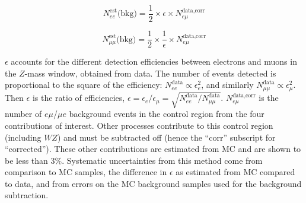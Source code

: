 \begin{equation}
N_{ee}^\text{est}\text{(bkg)} = \frac{1}{2} \times \epsilon \times N_{e\mu}^\text{data,corr}
\end{equation}

\begin{equation}
N_{\mu\mu}^\text{est}\text{(bkg)} = \frac{1}{2} \times \frac{1}{\epsilon} \times N_{e\mu}^\text{data,corr}
\end{equation}

\noindent $\epsilon$ accounts for the different detection efficiencies between electrons and muons in the $Z$-mass window, obtained from data. The number of events detected is proportional to the square of the efficiency: $N_{ee}^\text{data} \propto \epsilon_e^2$, and similarly $N_{\mu\mu}^\text{data} \propto \epsilon_\mu^2$. Then $\epsilon$ is the ratio of efficiencies, $\epsilon = \epsilon_e/\epsilon_\mu = \sqrt{N_{ee}^\text{data}/N_{\mu\mu}^\text{data}}$. $N_{e\mu}^\text{data,corr}$ is the number of $e\mu$/$\mu e$ background events in the control region from the four contributions of interest. Other processes contribute to this control region (including $WZ$) and must be subtracted off (hence the ``corr'' subscript for ``corrected''). These other contributions are estimated from MC and are shown to be less than $3\%$. Systematic uncertainties from this method come from comparison to MC samples, the difference in $\epsilon$ as estimated from MC compared to data, and from errors on the MC background samples used for the background subtraction.

